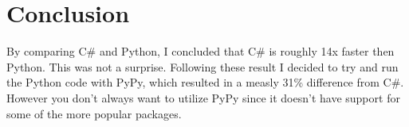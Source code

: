 \section{Conclusion}

By comparing C\# and Python, I concluded that C\# is roughly 14x faster then Python. This was not a surprise. Following these result I decided to try and run the Python code with PyPy, which resulted in a measly 31\% difference from C\#. However you don't always want to utilize PyPy since it doesn't have support for some of the more popular packages. 



